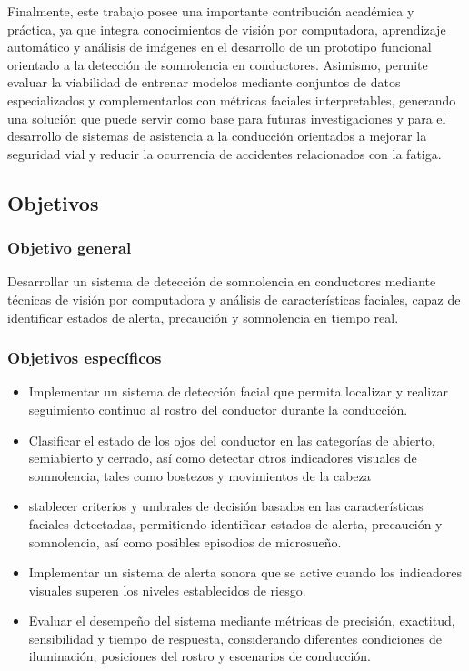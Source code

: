 \documentclass[conference]{IEEEtran}
\begin{document}
Finalmente, este trabajo posee una importante contribución académica y práctica, ya que integra conocimientos de visión por computadora, aprendizaje automático y análisis de imágenes en el desarrollo de un prototipo funcional orientado a la detección de somnolencia en conductores. Asimismo, permite evaluar la viabilidad de entrenar modelos mediante conjuntos de datos especializados y complementarlos con métricas faciales interpretables, generando una solución que puede servir como base para futuras investigaciones y para el desarrollo de sistemas de asistencia a la conducción orientados a mejorar la seguridad vial y reducir la ocurrencia de accidentes relacionados con la fatiga.


\subsection{Objetivos}

\subsubsection{Objetivo general}

Desarrollar un sistema de detección de somnolencia en conductores mediante técnicas de visión por computadora y análisis de características faciales, capaz de identificar estados de alerta, precaución y somnolencia en tiempo real.

\subsubsection{Objetivos específicos}

\begin{itemize}
\item Implementar un sistema de detección facial que permita localizar y realizar seguimiento continuo al rostro del conductor durante la conducción.

\item Clasificar el estado de los ojos del conductor en las categorías de abierto, semiabierto y cerrado, así como detectar otros indicadores visuales de somnolencia, tales como bostezos y movimientos de la cabeza

\item stablecer criterios y umbrales de decisión basados en las características faciales detectadas, permitiendo identificar estados de alerta, precaución y somnolencia, así como posibles episodios de microsueño.

\item Implementar un sistema de alerta sonora que se active cuando los indicadores visuales superen los niveles establecidos de riesgo.

\item Evaluar el desempeño del sistema mediante métricas de precisión, exactitud, sensibilidad y tiempo de respuesta, considerando diferentes condiciones de iluminación, posiciones del rostro y escenarios de conducción.
\end{itemize}
\end{document}
